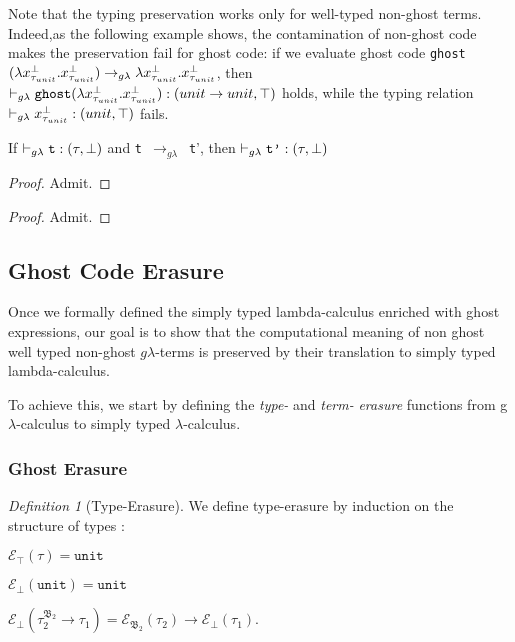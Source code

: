Note that the typing preservation works only for well-typed non-ghost terms. Indeed,as the following example shows, the contamination of non-ghost code makes the preservation fail for ghost code: if we evaluate
ghost code \quad \texttt{ghost} $(\lambda x^{\bot}_{\tau_{unit}}. x^{\bot}_{\tau_{unit}}) 
\rightarrow_{g\lambda} \lambda x^{\bot}_{\tau_{unit}}. x^{\bot}_{\tau_{unit}}$,  
then \\
${\vdash_{g\lambda} \texttt{ghost} (\lambda x^{\bot}_{\tau_{unit}}. x^{\bot}_{\tau_{unit}})  : (unit \rightarrow unit, \top)}$ holds, while the typing relation  ${\vdash_{g\lambda} x^{\bot}_{\tau_{unit}} : (unit, \top)}$ fails.



\begin{lemma} 
If ${\vdash_{g\lambda} \texttt{t} : (\tau, \mathfrak{\bot})}$ 
and \mbox{\texttt{t} $\rightarrow_{g\lambda}$ \texttt{t}'},
then ${\vdash_{g\lambda} \texttt{t'} : (\tau, \mathfrak{\bot})}$ 
\end{lemma}
\begin{proof}
Admit.
\end{proof}

\begin{theorem}[Soundness] 
\end{theorem}
\begin{proof}
Admit.
\end{proof}
\subsection{Ghost Code Erasure}
\newcommand{\e}{\mathcal{E}}
\theoremstyle{remark}
\newtheorem{dfn}[theorem]{Definition}

\qquad Once we formally defined the simply typed lambda-calculus enriched with ghost expressions, our goal is to show that the computational meaning
 of non ghost well typed non-ghost $g\lambda$-terms is preserved by their translation to simply typed lambda-calculus.

To achieve this, we start by defining the \textit{type-} and \textit{term-} \textit{erasure} functions from g$\lambda$-calculus to simply typed  $\lambda$-calculus. 


\subsubsection{Ghost Erasure}


\begin{dfn}[Type-Erasure] 
\label{type-erasure}
We define type-erasure by induction on the structure of types : \vspace{0.2cm} 

\noindent$ \e_{\top}(\tau) = \texttt{unit} $ 

\noindent$ \e_{\bot}(\texttt{unit}) = \texttt{unit}$ 

\noindent$ \e_{\bot}(\tau_{2}^{\mathfrak{B_{2}}} \rightarrow \tau_{1})  
= \e_{\mathfrak{B_{2}}}(\tau_{2}) \rightarrow \e_{\bot}(\tau_{1}) $. \\
\end{dfn} 

